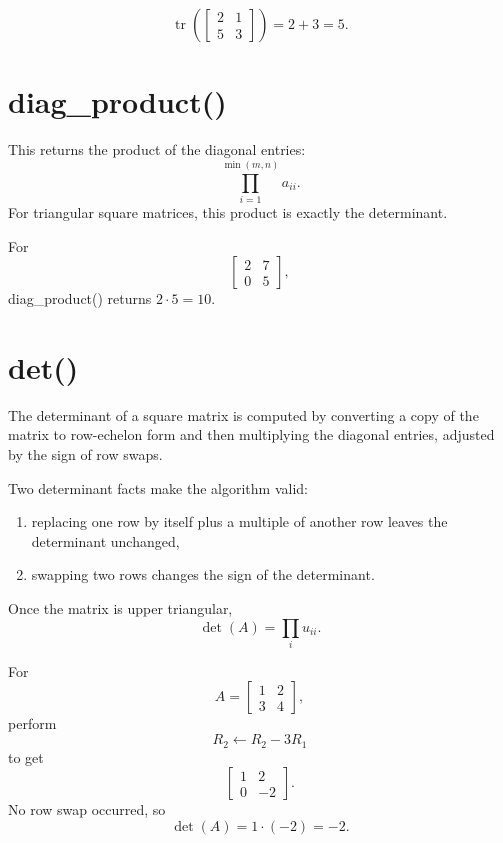 \documentclass[11pt,a4paper,openany]{book}
\def\code#1{#1}%
\DeclareRobustCommand{\code}[1]{\texttt{\detokenize{#1}}}
\DeclareMathOperator{\tr}{tr}
\begin{document}
\begin{examplebox}[Example]
\[
\tr\left(
\begin{bmatrix}
2 & 1 \\
5 & 3
\end{bmatrix}
\right) = 2 + 3 = 5.
\]
\end{examplebox}

\section{\code{diag_product()}}
This returns the product of the diagonal entries:
\[
\prod_{i=1}^{\min(m,n)} a_{ii}.
\]
For triangular square matrices, this product is exactly the determinant.

\begin{examplebox}[Example]
For
\[
\begin{bmatrix}
2 & 7 \\
0 & 5
\end{bmatrix},
\]
\code{diag_product()} returns \(2 \cdot 5 = 10\).
\end{examplebox}

\section{\code{det()}}
The determinant of a square matrix is computed by converting a copy of the matrix to row-echelon form and then multiplying the diagonal entries, adjusted by the sign of row swaps.

\begin{mathbox}
Two determinant facts make the algorithm valid:
\begin{enumerate}[label=\arabic*.]
    \item replacing one row by itself plus a multiple of another row leaves the determinant unchanged,
    \item swapping two rows changes the sign of the determinant.
\end{enumerate}
Once the matrix is upper triangular,
\[
\det(A) = \prod_i u_{ii}.
\]
\end{mathbox}

\begin{examplebox}[Example]
For
\[
A =
\begin{bmatrix}
1 & 2 \\
3 & 4
\end{bmatrix},
\]
perform
\[
R_2 \leftarrow R_2 - 3R_1
\]
to get
\[
\begin{bmatrix}
1 & 2 \\
0 & -2
\end{bmatrix}.
\]
No row swap occurred, so
\[
\det(A) = 1 \cdot (-2) = -2.
\]
\end{examplebox}
\end{document}
